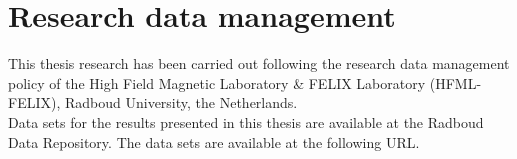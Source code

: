 \chapter{Research data management}

This thesis research has been carried out following the research data management policy of the High Field Magnetic Laboratory \& FELIX Laboratory (HFML-FELIX), Radboud University, the Netherlands.\\

Data sets for the results presented in this thesis are available at the Radboud Data Repository. The data sets are available at the following URL.